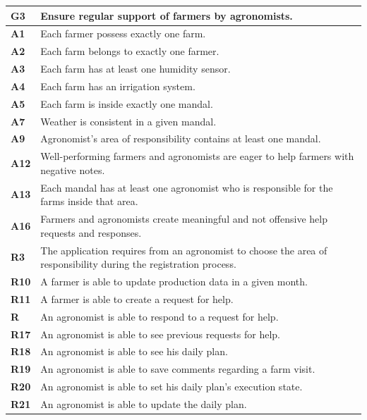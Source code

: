 \begin{table}[H]
\centering
    \begin{tabularx}{\linewidth}{lX} \toprule
         \textbf{G3} & Ensure regular support of farmers by agronomists. \\ \midrule
         \textbf{A1} & Each farmer possess exactly one farm. \\
         \textbf{A2} & Each farm belongs to exactly one farmer. \\
         \textbf{A3} & Each farm has at least one humidity sensor. \\
         \textbf{A4} & Each farm has an irrigation system. \\
         \textbf{A5} & Each farm is inside exactly one mandal. \\
         \textbf{A7} & Weather is consistent in a given mandal.\\
         \textbf{A9} & Agronomist's area of responsibility contains at least one mandal.\\
         \textbf{A12} & Well-performing farmers and agronomists are eager to help farmers with negative notes. \\
         \textbf{A13} & Each mandal has at least one agronomist who is responsible for the farms inside that area.\\
         \textbf{A16} & Farmers and agronomists create meaningful and not offensive help requests and responses.\\
         \midrule
         \textbf{R3} & The application requires from an agronomist  to choose the area of responsibility during the registration process. \\
         \textbf{R10} & A farmer is able to update production data in a given month.\\
          \textbf{R11} &  A farmer is able to create a request for help. \\
         \textbf{R} & An agronomist is able to respond to a request for help. \\
         \textbf{R17} & An agronomist is able to see previous requests for help. \\
         \textbf{R18} & An agronomist is able to see his daily plan. \\
         \textbf{R19} & An agronomist is able to save comments regarding a farm visit. \\
         \textbf{R20} & An agronomist is able to set his daily plan's execution state. \\
         \textbf{R21} & An agronomist is able to update the daily plan. \\

\end{tabularx}
\end{table}

